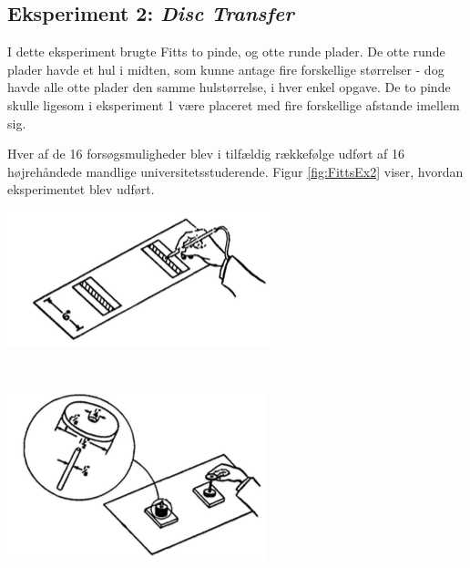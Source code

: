 \subsection*{Eksperiment 2: \textit{Disc Transfer}}
I dette eksperiment brugte Fitts to pinde, og otte runde plader. De otte runde plader havde et hul i midten, som kunne antage fire forskellige størrelser - dog havde alle otte plader den samme hulstørrelse, i hver enkel opgave. De to pinde skulle ligesom i eksperiment 1 være placeret med fire forskellige afstande imellem sig. 

Hver af de 16 forsøgsmuligheder blev i tilfældig rækkefølge udført af 16 højrehåndede mandlige universitetsstuderende. Figur \ref{fig:FittsEx2} viser, hvordan eksperimentet blev udført.

\begin{minipage}[c]{\linewidth}
	\begin{minipage}[b]{.45\linewidth}
		\includegraphics[width=\textwidth]{images/illustrations/fitt_ex1}
		\label{fig:FittsEx1}
	\end{minipage}
	\begin{minipage}[b]{.1\linewidth}
		~
	\end{minipage}
	\begin{minipage}[b]{.45\linewidth}
		\includegraphics[width=\textwidth]{images/illustrations/fitt_ex2}
		\label{fig:FittsEx2}
	\end{minipage}
\end{minipage}

